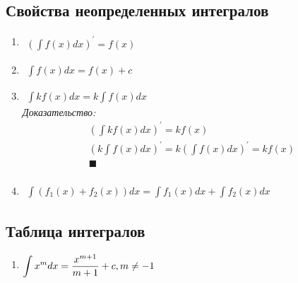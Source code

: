 \documentclass[12pt, fleqn]{book}
\begin{document}
	\subsection{Свойства неопределенных интегралов}
	\begin{enumerate}[1)]
		\item $\begin{gathered}
		 	\left(\int f(x)dx\right)^\prime=f(x)
		 \end{gathered}$
		\item 
		$\begin{gathered}
			\int f(x)dx=f(x) + c
		\end{gathered}$
		\item 
	$	\begin{gathered}
			\int kf(x)dx=k\int f(x)dx
		\end{gathered}$\\
		\textit{Доказательство:}
		\begin{multline*}
			\left(\int kf(x)dx\right)^\prime=kf(x)\\
			\left(k\int f(x)dx\right)^\prime=k\left(\int f(x) dx\right)^\prime=kf(x)\\
			\blacksquare\\
		\end{multline*}
		\item $\begin{gathered}
			\int \left(f_1(x) + f_2(x)\right)dx = \int f_1(x) dx + \int f_2(x) dx
		\end{gathered}$
	\end{enumerate}
	\subsection{Таблица интегралов}
	\begin{enumerate}[1)]
		\item $\begin{gathered}
			\int x^mdx=\frac{x^{m+1}}{m+1}+c, \space \space m \neq -1
		\end{gathered}$
		\textit{$ $}
	\end{enumerate}
\end{document}
